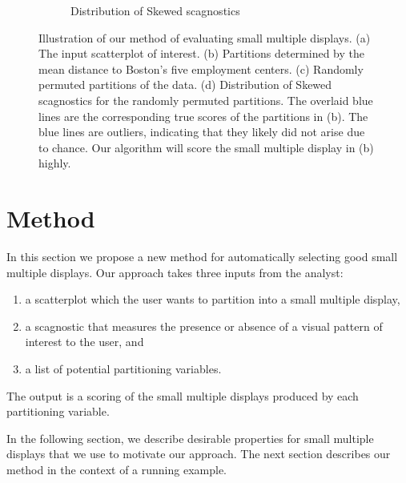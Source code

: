 \begin{figure}
\begin{subfigure}[t]{2.5in}
	\caption{Distribution of Skewed scagnostics}
	 \label{fig:method_dist}
     \end{subfigure}
   \caption{Illustration of our method of evaluating small multiple displays. (a) The input scatterplot of interest. (b) Partitions determined by the mean distance to Boston's five employment centers. (c) Randomly permuted partitions of the data. (d) Distribution of Skewed scagnostics for the randomly permuted partitions. The overlaid blue lines are the corresponding true scores of the partitions in (b). The blue lines are outliers, indicating that they likely did not arise due to chance. Our algorithm will score the small multiple display in (b) highly.}
\end{figure}


\section{Method}
\label{sec:method}

In this section we propose a new method for automatically selecting good small multiple displays. Our approach takes three inputs from the analyst:
\begin{enumerate}
\item a scatterplot which the user wants to partition into a small multiple display,
\item a scagnostic that measures the presence or absence of a visual pattern of interest to the user, and
\item a list of potential partitioning variables.
\end{enumerate}
The output is a scoring of the small multiple displays produced by each partitioning variable.

In the following section, we describe desirable properties for small multiple displays that we use to motivate our approach. The next section describes our method in the context of a running example.

